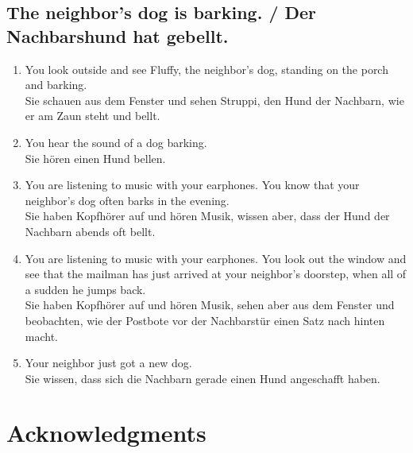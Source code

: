 \documentclass[11pt]{article}
\begin{document}
\subsection{The neighbor's dog is barking. / Der Nachbarshund hat gebellt.}

\begin{enumerate}
	\item You look outside and see Fluffy, the neighbor's dog, standing on the porch and barking.\\
	Sie schauen aus dem Fenster und sehen Struppi, den Hund der Nachbarn, wie er am Zaun steht und bellt.
	\item You hear the sound of a dog barking.\\
	Sie hören einen Hund bellen.
	\item You are listening to music with your earphones. You know that your neighbor's dog often barks in the evening.\\
	Sie haben Kopfhörer auf und hören Musik, wissen aber, dass der Hund der Nachbarn abends oft bellt.
	\item You are listening to music with your earphones. You look out the window and see that the mailman has just arrived at your neighbor's doorstep, when all of a sudden he jumps back.\\
	Sie haben Kopfhörer auf und hören Musik, sehen aber aus dem Fenster und beobachten, wie der Postbote vor der Nachbarstür einen Satz nach hinten macht.
	\item Your neighbor just got a new dog.\\
	Sie wissen, dass sich die Nachbarn gerade einen Hund angeschafft haben.
\end{enumerate}

\section{Acknowledgments}



   



\end{document}
